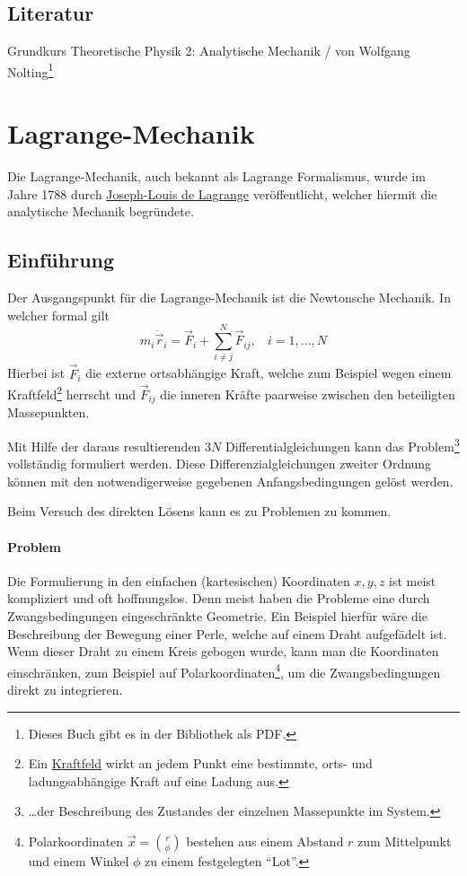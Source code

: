 \documentclass[oneside]{book}
\theoremstyle{definition}
\newcommand{\ddotvec}[1]{\ddot{\vec{#1}}}
\begin{document}
\subsection{Literatur} Grundkurs Theoretische Physik 2: Analytische Mechanik / von Wolfgang Nolting\footnote{Dieses Buch gibt es in der Bibliothek als PDF.}



\section{Lagrange-Mechanik}

Die Lagrange-Mechanik, auch bekannt als Lagrange Formalismus, wurde im Jahre 1788 durch \href{http://de.wikipedia.org/wiki/Joseph-Louis_Lagrange}{Joseph-Louis de Lagrange} veröffentlicht, welcher hiermit die analytische Mechanik begründete. 

\subsection{Einführung}
Der Ausgangspunkt für die Lagrange-Mechanik ist die Newtonsche Mechanik. In welcher formal gilt
$$ m_i \ddotvec{r}_i = \vec{F}_i + \sum_{i \neq j}^{N} \vec{F}_{ij}, ~~~~i = 1, \dots, N$$
Hierbei ist $\vec{F}_i$ die externe ortsabhängige Kraft, welche zum Beispiel wegen einem Kraftfeld\footnote{Ein \href{http://de.wikipedia.org/wiki/Kraftfeld}{Kraftfeld} wirkt an jedem Punkt eine bestimmte, orts- und ladungsabhängige Kraft auf eine Ladung aus.} herrscht und $\vec{F}_{ij}$ die inneren Kräfte paarweise zwischen den beteiligten Massepunkten.

Mit Hilfe der daraus resultierenden $3N$ Differentialgleichungen kann das Problem\footnote{\dots der Beschreibung des Zustandes der einzelnen Massepunkte im System.} vollständig formuliert werden. Diese Differenzialgleichungen zweiter Ordnung können mit den notwendigerweise gegebenen Anfangsbedingungen gelöst werden.

Beim Versuch des direkten Lösens kann es zu Problemen zu kommen. 

\paragraph{Problem} Die Formulierung in den einfachen (kartesischen) Koordinaten $x, y, z$ ist meist kompliziert und oft hoffnungslos.
Denn meist haben die Probleme eine durch Zwangsbedingungen eingeschränkte Geometrie. Ein Beispiel hierfür wäre die Beschreibung der Bewegung einer Perle, welche auf einem Draht aufgefädelt ist. Wenn dieser Draht zu einem Kreis gebogen wurde, kann man die Koordinaten einschränken, zum Beispiel auf Polarkoordinaten\footnote{Polarkoordinaten $\vec{x} = \binom{r}{\phi}$ bestehen aus einem Abstand $r$ zum Mittelpunkt und einem Winkel $\phi$ zu einem festgelegten "`Lot"'.}, um die Zwangsbedingungen direkt zu integrieren.
\end{document}
